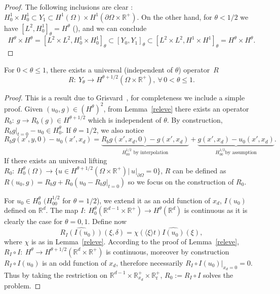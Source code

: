 \documentclass[AHL,Unicode,longabstracts,published]{cedram}
\newcommand{\R}{\mathbb{R}}
\newcommand{\cxi}{\langle \xi\rangle}
\let\oldforall\forall
\renewcommand*{\forall}{\mathrel{\oldforall}}
\begin{document}
\begin{proof}
The following inclusions are clear : $H^1_0\times H^1_0\subset Y_1\subset H^1(\Omega)
\times H^1(\partial\Omega\times \R^+)$. On the other hand, for $\theta<1/2$ we have $[L^2,H^1_0]_\theta=H^\theta$ (\cite[Chapter~1 Section~11]{lionsmagenes}), and we can conclude
\[
H^\theta\times H^\theta=\left[L^2\times L^2,H^1_0\times H^1_0\right]_\theta\subset \left[Y_0,Y_1\right]_\theta\subset \left[L^2\times L^2,H^1\times H^1\right]_\theta= H^\theta\times H^\theta.
\]
\end{proof}

\begin{lemm}\label{relevecoin}
For $0<\theta\leq 1$, there exists a universal (independent of $\theta$) operator~$R$
\[
R:\ Y_\theta\to H^{\theta+1/2}(\Omega\times \R^+),\ \forall\, 0<\theta\leq 1.
\]
\end{lemm}


\begin{proof}
This is a result due to Grisvard~\cite{Grisvard}, for completeness we include a simple proof. Given $(u_0,g)\in (H^\theta)^2$, from Lemma~\ref{releve} there exists an operator $R_b:\ g\to R_b(g)\in H^{\theta+1/2}$ which is independent of $\theta$. By construction, $R_bg|_{t=0}-u_0\in H^\theta_0$. If $\theta=1/2$, we also notice
\[
R_bg(x',y,0)-u_0(x',x_d)=
\underbrace{R_bg(x',x_d,0)-g(x',x_d)}_{H^{1/2}_{00}\text{ by interpolation}} +\underbrace{g(x',x_d)-u_0(x',x_d)}_{H^{1/2}_{00}
\text{by assumption}}.
\]
If there exists an universal lifting $R_0:\ H^\theta_0(\Omega)\to \{u\in H^{\theta+1/2}(\Omega\times \R^+)|\ u|_{\partial\Omega}=0\}$, $R$ can be defined as $R(u_0,g)=R_bg+R_0(u_0-R_bg|_{t=0})$ so we focus on the construction of $R_0$.


For $u_0\in H^\theta_0$ $(H^{1/2}_{00}$ for $\theta=1/2$), we extend it as an odd function of $x_d$, $I(u_0)$ defined on $\R^d$. The map $I:\ H^\theta_0(\R^{d-1}\times \R^+)\to H^\theta(\R^d)$ is continuous as it is clearly the case for $\theta=0,1$. Define now
\[
\widehat{R_I(I(u_0))}(\xi,\delta)=\chi(\cxi t)\widehat{I(u_0)}(\xi),
\]
where $\chi$ is as in Lemma~\ref{releve}. According to the proof of Lemma~\ref{releve}, $R_I\circ I:\ H^\theta\to H^{\theta+1/2}(\R^d\times \R^+)$ is continuous, moreover by construction $R_I\circ I(u_0)$ is an odd function of $x_d$, therefore necessarily $R_I\circ I (u_0)|_{x_d=0}=0$. Thus by taking the restriction on $\R^{d-1}\times \R^+_{x_d}
\times \R_t^+$, $R_0:=R_I\circ I$ solves the problem.
\end{proof}
\end{document}
